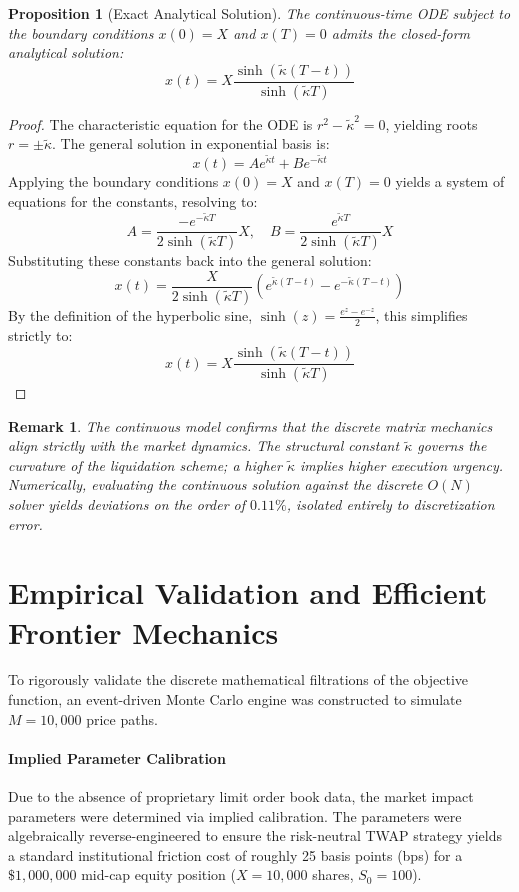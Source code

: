 \documentclass[11pt,a4paper]{article}
\newtheorem{proposition}[theorem]{Proposition}
\newtheorem{remark}[theorem]{Remark}
\begin{document}
\begin{proposition}[Exact Analytical Solution]
The continuous-time ODE subject to the boundary conditions $x(0) = X$ and $x(T) = 0$ admits the closed-form analytical solution:
\[ x(t) = X \frac{\sinh(\tilde{\kappa}(T-t))}{\sinh(\tilde{\kappa} T)} \]
\end{proposition}

\begin{proof}
The characteristic equation for the ODE is $r^2 - \tilde{\kappa}^2 = 0$, yielding roots $r = \pm \tilde{\kappa}$. The general solution in exponential basis is:
\[ x(t) = A e^{\tilde{\kappa}t} + B e^{-\tilde{\kappa}t} \]
Applying the boundary conditions $x(0) = X$ and $x(T) = 0$ yields a system of equations for the constants, resolving to:
\[ A = \frac{-e^{-\tilde{\kappa}T}}{2\sinh(\tilde{\kappa}T)}X, \quad B = \frac{e^{\tilde{\kappa}T}}{2\sinh(\tilde{\kappa}T)}X \]
Substituting these constants back into the general solution:
\[ x(t) = \frac{X}{2\sinh(\tilde{\kappa}T)} \left( e^{\tilde{\kappa}(T-t)} - e^{-\tilde{\kappa}(T-t)} \right) \]
By the definition of the hyperbolic sine, $\sinh(z) = \frac{e^z - e^{-z}}{2}$, this simplifies strictly to:
\[ x(t) = X \frac{\sinh(\tilde{\kappa}(T-t))}{\sinh(\tilde{\kappa}T)} \]
\end{proof}

\begin{remark}
The continuous model confirms that the discrete matrix mechanics align strictly with the market dynamics. The structural constant $\tilde{\kappa}$ governs the curvature of the liquidation scheme; a higher $\tilde{\kappa}$ implies higher execution urgency. Numerically, evaluating the continuous solution against the discrete $O(N)$ solver yields deviations on the order of $0.11\%$, isolated entirely to discretization error.
\end{remark}

\section{Empirical Validation and Efficient Frontier Mechanics}

To rigorously validate the discrete mathematical filtrations of the objective function, an event-driven Monte Carlo engine was constructed to simulate $M=10,000$ price paths. 

\paragraph{Implied Parameter Calibration}
Due to the absence of proprietary limit order book data, the market impact parameters were determined via implied calibration. The parameters were algebraically reverse-engineered to ensure the risk-neutral TWAP strategy yields a standard institutional friction cost of roughly 25 basis points (bps) for a $\$1,000,000$ mid-cap equity position ($X = 10,000$ shares, $S_0 = 100$). 
\end{document}
